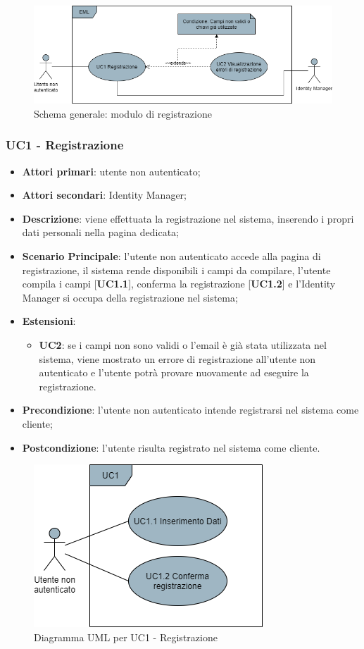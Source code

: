 \begin{figure}[H]
\centering
\includegraphics[scale=0.6]{res/UseCase/Immagini/RegistrazioneGenerale}
\caption{Schema generale: modulo di registrazione}
\end{figure}

\subsubsection{UC1 - Registrazione}
\begin{itemize}
\item \textbf{Attori primari}: utente non autenticato;
\item \textbf{Attori secondari}: Identity Manager;
\item \textbf{Descrizione}: viene effettuata la registrazione nel sistema, inserendo i propri dati personali nella pagina dedicata;
\item \textbf{Scenario Principale}: l'utente non autenticato accede alla pagina di registrazione, il sistema rende disponibili i campi da compilare, l'utente compila i campi [\textbf{UC1.1}], conferma la registrazione [\textbf{UC1.2}] e l'Identity Manager si occupa della registrazione nel sistema;
\item \textbf{Estensioni}:
\begin{itemize}
\item \textbf{UC2}: se i campi non sono validi o l'email è già stata utilizzata nel sistema, viene mostrato un errore di registrazione all'utente non autenticato e l'utente potrà provare nuovamente ad eseguire la registrazione.
\end{itemize}
\item \textbf{Precondizione}: l'utente non autenticato intende registrarsi nel sistema come cliente;
\item \textbf{Postcondizione}: l'utente risulta registrato nel sistema come cliente.
\end{itemize}

\begin{figure}[H]
\centering
\includegraphics[scale=0.6]{res/UseCase/Immagini/Registrazione}
\caption{Diagramma UML per UC1 - Registrazione}
\end{figure}


